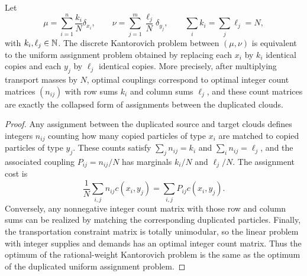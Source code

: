 \begin{proposition}\label{prop-rational-weights-duplicated-matching}
	Let
	\[
		\mu=\sum_{i=1}^n \frac{k_i}{N}\delta_{x_i},
		\qquad
		\nu=\sum_{j=1}^m \frac{\ell_j}{N}\delta_{y_j},
		\qquad
		\sum_i k_i=\sum_j\ell_j=N,
	\]
	with $k_i,\ell_j\in\mathbb{N}$. The discrete Kantorovich problem between $(\mu,\nu)$ is equivalent to the uniform assignment problem obtained by replacing each $x_i$ by $k_i$ identical copies and each $y_j$ by $\ell_j$ identical copies. More precisely, after multiplying transport masses by $N$, optimal couplings correspond to optimal integer count matrices $(n_{ij})$ with row sums $k_i$ and column sums $\ell_j$, and these count matrices are exactly the collapsed form of assignments between the duplicated clouds.
\end{proposition}
\begin{proof}
	Any assignment between the duplicated source and target clouds defines integers $n_{ij}$ counting how many copied particles of type $x_i$ are matched to copied particles of type $y_j$. These counts satisfy $\sum_j n_{ij}=k_i$ and $\sum_i n_{ij}=\ell_j$, and the associated coupling $P_{ij}=n_{ij}/N$ has marginals $k_i/N$ and $\ell_j/N$. The assignment cost is
	\[
		\frac1N\sum_{i,j} n_{ij}c(x_i,y_j)
		=
		\sum_{i,j}P_{ij}c(x_i,y_j).
	\]
	Conversely, any nonnegative integer count matrix with those row and column sums can be realized by matching the corresponding duplicated particles. Finally, the transportation constraint matrix is totally unimodular, so the linear problem with integer supplies and demands has an optimal integer count matrix. Thus the optimum of the rational-weight Kantorovich problem is the same as the optimum of the duplicated uniform assignment problem.
\end{proof}

